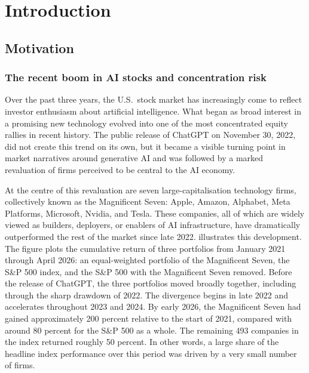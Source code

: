 \chapter{Introduction}
\label{ch:introduction}

\section{Motivation}
\label{sec:motivation}

\subsection{The recent boom in AI stocks and concentration risk}
\label{subsec:ai-stock-boom}

Over the past three years, the U.S.\ stock market has increasingly come to reflect investor enthusiasm about artificial intelligence. What began as broad interest in a promising new technology evolved into one of the most concentrated equity rallies in recent history. The public release of ChatGPT on November 30, 2022, did not create this trend on its own, but it became a visible turning point in market narratives around generative AI and was followed by a marked revaluation of firms perceived to be central to the AI economy.

At the centre of this revaluation are seven large-capitalisation technology firms, collectively known as the Magnificent Seven: Apple, Amazon, Alphabet, Meta Platforms, Microsoft, Nvidia, and Tesla. These companies, all of which are widely viewed as builders, deployers, or enablers of AI infrastructure, have dramatically outperformed the rest of the market since late 2022.  illustrates this development. The figure plots the cumulative return of three portfolios from January 2021 through April 2026: an equal-weighted portfolio of the Magnificent Seven, the S\&P 500 index, and the S\&P 500 with the Magnificent Seven removed. Before the release of ChatGPT, the three portfolios moved broadly together, including through the sharp drawdown of 2022. The divergence begins in late 2022 and accelerates throughout 2023 and 2024. By early 2026, the Magnificent Seven had gained approximately 200 percent relative to the start of 2021, compared with around 80 percent for the S\&P 500 as a whole. The remaining 493 companies in the index returned roughly 50 percent. In other words, a large share of the headline index performance over this period was driven by a very small number of firms.

